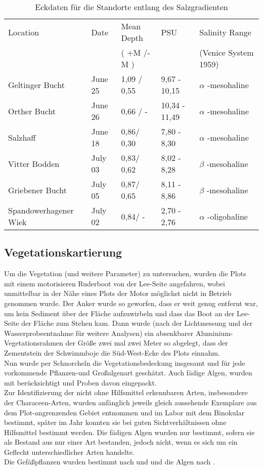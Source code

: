 \begin{table}[htb]{\textwidth}
\caption{Eckdaten für die Standorte entlang des Salzgradienten}
\begin{tabular}{lllll}
\toprule
 Location				& Date		& Mean Depth	& PSU 			& Salinity Range   \\
 						& 			& ( +M /-M )	& 				& (Venice System 1959)\\
\midrule
Geltinger Bucht 		& June 25	& 1,09 / 0,55	& 9,67 - 10,15 	& $ \alpha $ -mesohaline\\ 
Orther Bucht			& June 26 	& 0,66 / -		& 10,34 - 11,49 & $ \alpha $ -mesohaline\\
Salzhaff 				& June 18 	& 0,86/ 0,30	& 7,80 - 8,30  	& $ \alpha $ -mesohaline\\
\midrule
Vitter Bodden			& July 03 	& 0,83/ 0,62	& 8,02 - 8,28  	& $ \beta $ -mesohaline\\
Griebener Bucht			& July 05 	& 0,87/ 0,65	& 8,11 - 8,86	& $ \beta $ -mesohaline\\
\midrule
Spandowerhagener Wiek 	& July 02 	& 0,84/ -		& 2,70 - 2,76  	& $ \alpha $ -oligohaline\\
\bottomrule
\end{tabular}
\label{Salztabelle}
\end{table}






\subsection{Vegetationskartierung}

Um die Vegetation (und weitere Parameter) zu untersuchen, wurden die Plots mit einem motorisieren Ruderboot von der Lee-Seite angefahren, wobei unmittelbar in der Nähe eines Plots der Motor möglichst nicht in Betrieb genommen wurde. Der Anker wurde so geworfen, dass er weit genug entfernt war, um kein Sediment über der Fläche aufzuwirbeln und dass das Boot an der Lee-Seite der Fläche zum Stehen kam. Dann wurde (nach der Lichtmessung und der Wasserprobeentnahme für weitere Analysen) ein absenkbarer Aluminium-Vegetationsrahmen der Größe zwei mal zwei Meter so abgelegt, dass der Zementstein der Schwimmboje die Süd-West-Ecke des Plots einnahm. \\
Nun wurde per Schnorcheln die Vegetationsbedeckung insgesamt und für jede vorkommende Pflanzen-und Großalgenart geschätzt. Auch fädige Algen, wurden mit berücksichtigt und Proben davon eingepackt. \\ 
Zur Identifizierung der nicht ohne Hilfsmittel erkennbaren Arten, insbesondere der Characeen-Arten, wurden anfänglich jeweils gleich aussehende Exemplare aus dem Plot-angrenzenden Gebiet entnommen und im Labor mit dem Binokular bestimmt, später im Jahr konnten sie bei guten Sichtverhältnissen ohne Hilfsmittel bestimmt werden. Die fädigen Algen wurden nur bestimmt, sofern sie als Bestand aus nur einer Art bestanden, jedoch nicht, wenn es sich um ein Geflecht unterschiedlicher Arten handelte.\\
Die Gefäßpflanzen wurden bestimmt nach \cite{van_de_weyer_2007} und \cite{rothmaler_2005} und die Algen nach \cite{pankow_1971}.\\


